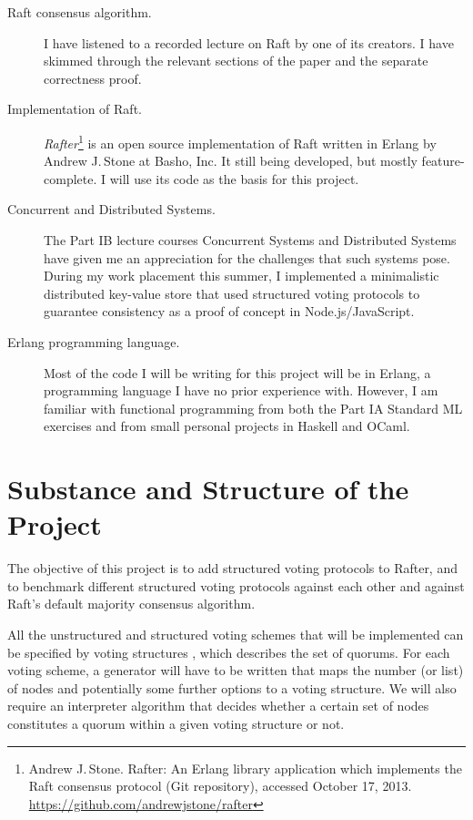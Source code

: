 \documentclass[12pt]{scrartcl}
\begin{document}
\begin{description}

\item[Raft consensus algorithm.] I have listened to a recorded lecture on Raft by one of its creators. I have skimmed through the relevant sections of the paper and the separate correctness proof.

\item[Implementation of Raft.] \emph{Rafter}\footnote{Andrew J.\,Stone. Rafter: An Erlang library application which implements the Raft consensus protocol (Git repository), accessed October 17, 2013. \url{https://github.com/andrewjstone/rafter}} is an open source implementation of Raft written in Erlang by Andrew J.\,Stone at Basho, Inc. It still being developed, but mostly feature-complete. I will use its code as the basis for this project.

\item[Concurrent and Distributed Systems.] The Part IB lecture courses Concurrent Systems and Distributed Systems have given me an appreciation for the challenges that such systems pose. During my work placement this summer, I implemented a minimalistic distributed key-value store that used structured voting protocols to guarantee consistency as a proof of concept in Node.js/JavaScript.

\item[Erlang programming language.] Most of the code I will be writing for this project will be in Erlang, a programming language I have no prior experience with. However, I am familiar with functional programming from both the Part IA Standard ML exercises and from small personal projects in Haskell and OCaml.

\end{description}


\section{Substance and Structure of the Project%
  \label{substance-and-structure-of-the-project}%
}

The objective of this project is to add structured voting protocols to Rafter, and to benchmark different structured voting protocols against each other and against Raft's default majority consensus algorithm.

All the unstructured and structured voting schemes that will be implemented can be specified by voting structures \cite{voting}, which describes the set of quorums. For each voting scheme, a generator will have to be written that maps the number (or list) of nodes and potentially some further options to a voting structure. We will also require an interpreter algorithm that decides whether a certain set of nodes constitutes a quorum within a given voting structure or not.
\end{document}
